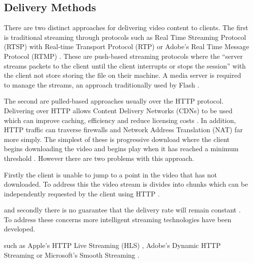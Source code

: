 \documentclass[journal]{IEEEtran}
\begin{document}
\subsection{Delivery Methods}
There are two distinct approaches for delivering video content to clients. The first is traditional streaming through protocols such as Real Time Streaming Protocol (RTSP) \cite{misc:rfcRSTP} with Real-time Transport Protocol (RTP) \cite{misc:rfcRTP} or Adobe's Real Time Message Protocol (RTMP)\cite{website:RTMP} \cite{article:areWeInTheMiddleOfAVideoStreamingRevolution}. These are push-based streaming protocols where the ``server streams packets to the client until the client interrupts or stops the session'' \cite{article:watchingVideoOverTheWeb} with the client not store storing the file on their machine. A media server is required to manage the streams, an approach traditionally used by Flash \cite{article:flashPlayer}.

The second are pulled-based approaches usually over the HTTP protocol. Delivering over HTTP allows  Content Delivery Networks (CDNs) to be used which can improve caching, efficiency and reduce licensing costs \cite{article:towardsVideoOnTheWebWithHTML5}\cite{inproceedings:HTTPAsTheNarrowWaist}. In addition, HTTP traffic can traverse firewalls and Network Address Translation (NAT) far more simply. %
The simplest of these is progressive download where the client begins downloading the video and begins play when it has reached a minimum threshold \cite{article:watchingVideoOverTheWeb}. However there are two problems with this approach.

Firstly the client is unable to jump to a point in the video that has not downloaded. %
To address this the video stream is divides into chunks which can be independently requested by the client using HTTP \cite{article:areWeInTheMiddleOfAVideoStreamingRevolution}. 


and secondly there is no guarantee that the delivery rate will remain constant \cite{article:towardsVideoOnTheWebWithHTML5}. To address these concerns more intelligent streaming technologies have been developed.


such as Apple's HTTP Live Streaming (HLS) \cite{misc:HTTPLiveStreaming}, Adobe's Dynamic HTTP Streaming \cite{website:HTTPDynamicStreaming} or Microsoft's Smooth Streaming \cite{website:smoothStreaming} \cite{inproceedings:aSeamlessIntegrationOfAdaptiveHTTPStreaming}. 
\end{document}
